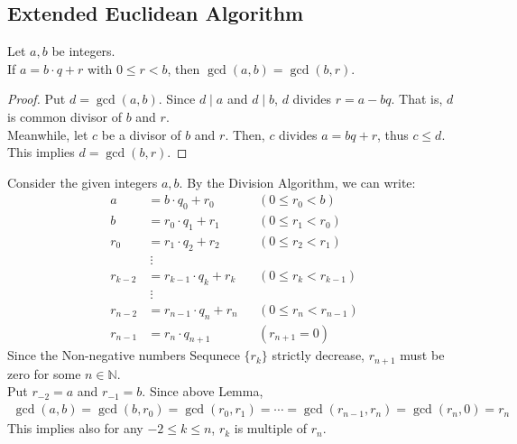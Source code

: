 \newpage
\subsection{Extended Euclidean Algorithm}
\begin{lemma}
    Let $a,b$ be integers. \\
    If $a = b \cdot q + r$ with $0 \leq r < b$,
    then $\gcd(a,b) = \gcd(b,r)$.
\end{lemma}
\begin{proof}
    Put $d = \gcd(a,b)$. Since $d \mid a$ and $d \mid b$, $d$ divides $r = a - bq$.
    That is, $d$ is common divisor of $b$ and $r$. \\
    Meanwhile, let $c$ be a divisor of $b$ and $r$. Then, $c$ divides $a = bq + r$, thus $c \leq d$.
    This implies $d = \gcd(b,r)$.
\end{proof}
Consider the given integers $a,b$. By the Division Algorithm, we can write:
\begin{align*}
    a &= b \cdot q_0 + r_0 &&(0 \leq r_0 < b)\\
    b &= r_0 \cdot q_1 + r_1 &&(0 \leq r_1 < r_0)\\
    r_0 &= r_1 \cdot q_2 + r_2 &&(0 \leq r_2 < r_1)\\
    &\ \vdots \\
    r_{k-2}&= r_{k-1} \cdot q_{k} + r_{k} &&(0 \leq r_k < r_{k-1})\\
    &\ \vdots \\
    r_{n-2} &= r_{n-1} \cdot q_n + r_n &&(0 \leq r_n < r_{n-1})\\
    r_{n-1} &= r_{n} \cdot q_{n+1} &&(r_{n+1} = 0)
\end{align*}
Since the Non-negative numbers Sequnece $\{r_k\}$ strictly decrease, $r_{n+1}$ must be zero for some $n \in \mathbb{N}$. \\
Put $r_{-2} = a$ and $r_{-1} = b$. Since above Lemma,
\begin{align*}
    \gcd(a,b) = \gcd(b, r_0) = \gcd(r_0, r_1) = \cdots = \gcd(r_{n-1}, r_n) = \gcd(r_n, 0) = r_n
\end{align*}
This implies also for any $-2 \leq k \leq n$, $r_k$ is multiple of $r_n$. \\
